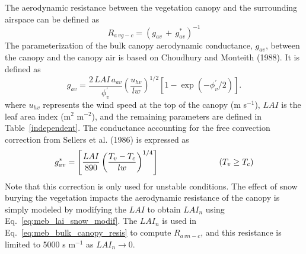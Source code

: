 The aerodynamic resistance between the vegetation canopy and the
surrounding airspace can be defined as
%
\begin{equation}
  \label{eq:meb_bulk_canopy_resis}
  R_{a\,vg-c} = {\left( g_{av} \,+\, g_{av}^\ast \right)}^{-1}
\end{equation}
%
The parameterization of the bulk canopy aerodynamic conductance, $g_{av}$, 
between the canopy and the canopy air is based on 
Choudhury and Monteith (1988)\nocite{Choudhury88}.
It is defined as
%
\begin{equation}
  \label{eq:meb_condrb}
  g_{av} = 
\frac{2 \, LAI \, a_{av}}{\phi_v^\prime}\left(\frac{u_{hv}}{lw}\right)^{1/2}[1-\exp(-\phi_v^\prime/2)].
\end{equation}
%
where 
$u_{hv}$ represents the wind speed at the top of the canopy
(m s$^{-1}$),
$LAI$ is the leaf area index (m$^{2}$ m$^{-2}$), and the remaining parameters are
defined in Table~\ref{independent}.
%
The conductance accounting for the free convection correction
from Sellers et al. (1986)\nocite{Sellers86}
is expressed as
%
\begin{equation}
  \label{eq:meb_freeconv}
  g_{av}^\ast = \left[ \frac{LAI}{890} \left(\frac{T_{v} -
        T_{c}}{lw}\right)^{1/4}\right]
\hskip1.in \left( T_{v} \geq T_{c} \right)
\end{equation}
%
Note that this correction is only used for unstable conditions.
%
The effect of snow burying the vegetation impacts the aerodynamic
resistance of the canopy is simply modeled by modifying the $LAI$
to obtain $LAI_n$ using Eq.~\ref{eq:meb_lai_snow_modif}.
%
The $LAI_n$ is used in
Eq.~\ref{eq:meb_bulk_canopy_resis} to compute $R_{a\,vn-c}$, and this
resistance is limited to 5000 s m$^{-1}$ as $LAI_n \rightarrow 0$.




